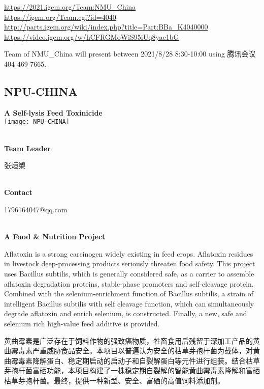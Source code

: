 \url{https://2021.igem.org/Team:NMU\_China }\\
\url{https://igem.org/Team.cgi?id=4040 }\\
\url{http://parts.igem.org/wiki/index.php?title=Part:BBa_K4040000 }\\
\url{https://video.igem.org/w/hCFRGMoWiS95iUq8yae1bG }\\

\vfill{}









Team of NMU\_China will present between    2021/8/28 8:30-10:00     using 腾讯会议 404 469 7665.
\newpage


\subsection{\textcolor{Blu}{ NPU-CHINA } }
\vspace{5mm}
\begin{center}
\large{
  \textbf{ A Self-lysis Feed Toxinicide }\\
  \texttt{[image: NPU-CHINA]}
}
\end{center}
\textbf{\\Team Leader}

  张烜槊


\textbf{\\Contact}

  1796164047@qq.com


\textbf{\\A Food & Nutrition Project\\}\begin{spacing}{1.5}

Aflatoxin is a strong carcinogen widely existing in feed crops. Aflatoxin residues in livestock deep-processing products seriously threaten food safety. This project uses Bacillus subtilis, which is generally considered safe, as a carrier to assemble aflatoxin degradation proteins, stable-phase promoters and self-cleavage protein. Combined with the selenium-enrichment function of Bacillus subtilis, a strain of intelligent Bacillus subtilis with self cleavage function, which can simultaneously degrade aflatoxin and enrich selenium, is constructed. Finally, a new, safe and selenium rich high-value feed additive is provided.

黄曲霉素是广泛存在于饲料作物的强致癌物质，牲畜食用后残留于深加工产品的黄曲霉毒素严重威胁食品安全。本项目以普遍认为安全的枯草芽孢杆菌为载体，对黄曲霉毒素降解蛋白、稳定期启动的启动子和自裂解蛋白等元件进行组装。结合枯草芽孢杆菌富硒功能，本项目构建了一株稳定期自裂解的智能黄曲霉毒素降解和富硒枯草芽孢杆菌。最终，提供一种新型、安全、富硒的高值饲料添加剂。\end{spacing}
\\

